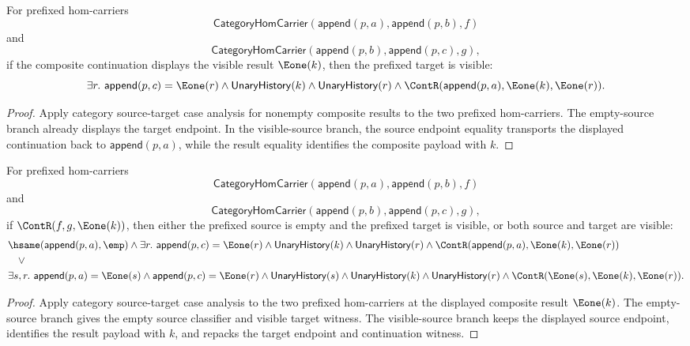 \begin{theorem}
\label{thm:functor-prefix-hom-carrier-comp-nonempty-result-target-visible}
For prefixed hom-carriers
$$
\mathsf{CategoryHomCarrier}(\mathsf{append}(p,a),\mathsf{append}(p,b),f)
$$
and
$$
\mathsf{CategoryHomCarrier}(\mathsf{append}(p,b),\mathsf{append}(p,c),g),
$$
if the composite continuation displays the visible result $\Eone(k)$, then
the prefixed target is visible:
$$
\exists r.\ \mathsf{append}(p,c)=\Eone(r)\wedge
\mathsf{UnaryHistory}(k)\wedge\mathsf{UnaryHistory}(r)\wedge
\ContR(\mathsf{append}(p,a),\Eone(k),\Eone(r)).
$$
\end{theorem}
\begin{proof}
Apply category source-target case analysis for nonempty composite results to
the two prefixed hom-carriers. The empty-source branch already displays the
target endpoint. In the visible-source branch, the source endpoint equality
transports the displayed continuation back to $\mathsf{append}(p,a)$, while
the result equality identifies the composite payload with $k$.
\end{proof}

\begin{theorem}
\label{thm:functor-prefix-hom-carrier-comp-nonempty-result-source-target-cases}
For prefixed hom-carriers
$$
\mathsf{CategoryHomCarrier}(\mathsf{append}(p,a),\mathsf{append}(p,b),f)
$$
and
$$
\mathsf{CategoryHomCarrier}(\mathsf{append}(p,b),\mathsf{append}(p,c),g),
$$
if $\ContR(f,g,\Eone(k))$, then either the prefixed source is empty and the
prefixed target is visible, or both source and target are visible:
$$
\begin{aligned}
&\hsame(\mathsf{append}(p,a),\emp)\wedge
\exists r.\ \mathsf{append}(p,c)=\Eone(r)\wedge
\mathsf{UnaryHistory}(k)\wedge\mathsf{UnaryHistory}(r)\wedge
\ContR(\mathsf{append}(p,a),\Eone(k),\Eone(r))\\
&\quad\vee\\
&\exists s,r.\ \mathsf{append}(p,a)=\Eone(s)\wedge
\mathsf{append}(p,c)=\Eone(r)\wedge
\mathsf{UnaryHistory}(s)\wedge\mathsf{UnaryHistory}(k)\wedge
\mathsf{UnaryHistory}(r)\wedge
\ContR(\Eone(s),\Eone(k),\Eone(r)).
\end{aligned}
$$
\end{theorem}
\begin{proof}
Apply category source-target case analysis to the two prefixed hom-carriers at
the displayed composite result $\Eone(k)$. The empty-source branch gives the
empty source classifier and visible target witness. The visible-source branch
keeps the displayed source endpoint, identifies the result payload with $k$,
and repacks the target endpoint and continuation witness.
\end{proof}

